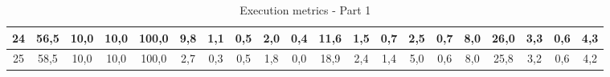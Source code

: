 \begin{sidewaystable}[]
\begin{tabular}{|c|c|c|c|c|c|c|c|c|c|c|c|c|c|c|c|c|c|c|c|}
    24 & 56,5                                            & 10,0                                            & 10,0                                            & 100,0                                           & 9,8                                             & 1,1                                             & 0,5                                             & 2,0                                             & 0,4                                             & 11,6                                             & 1,5                                              & 0,7                                              & 2,5                                              & 0,7                                              & 8,0                                              & 26,0                                             & 3,3                                              & 0,6                                              & 4,3                                              \\ \hline
    25 & 58,5                                            & 10,0                                            & 10,0                                            & 100,0                                           & 2,7                                             & 0,3                                             & 0,5                                             & 1,8                                             & 0,0                                             & 18,9                                             & 2,4                                              & 1,4                                              & 5,0                                              & 0,6                                              & 8,0                                              & 25,8                                             & 3,2                                              & 0,6                                              & 4,2                                              \\ \hline
    \end{tabular}
    \caption{Execution metrics - Part 1}
    \label{tab:ap:exec_metrics_1}
\end{sidewaystable}

